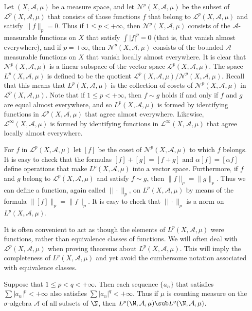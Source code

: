 Let $(X,\mathcal{A},\mu)$ be a measure space, and let $\mathcal{N}^p(X,\mathcal{A},\mu)$ be the subset of $\mathcal{L}^p(X,\mathcal{A},\mu)$ that consists of those functions $f$ that belong to $\mathcal{L}^p(X,\mathcal{A},\mu)$ and satisfy $\|f\|_p=0$. Thus if $1\leq p<+\infty$, then $\mathcal{N}^p(X,\mathcal{A},\mu)$ consists of the $\mathcal{A}$-measurable functions on $X$ that satisfy $\int|f|^p=0$ (that is, that vanish almost everywhere), and if $p=+\infty$, then $\mathcal{N}^p(X,\mathcal{A},\mu)$ consists of the bounded $\mathcal{A}$-measurable functions on $X$ that vanish locally almost everywhere. It is clear that $\mathcal{N}^p(X,\mathcal{A},\mu)$ is a linear subspace of the vector space $\mathcal{L}^p(X,\mathcal{A},\mu)$. The space $L^p(X,\mathcal{A},\mu)$ is defined to be the quotient $\mathcal{L}^p(X,\mathcal{A},\mu)/\mathcal{N}^p(X,\mathcal{A},\mu)$. Recall that this means that $L^p(X,\mathcal{A},\mu)$ is the collection of cosets of $\mathcal{N}^p(X,\mathcal{A},\mu)$ in $\mathcal{L}^p(X,\mathcal{A},\mu)$. Note that if $1\leq p<+\infty$, then $f\sim g$ holds if and only if $f$ and $g$ are equal almost everywhere, and so $L^p(X,\mathcal{A},\mu)$ is formed by identifying functions in $\mathcal{L}^p(X,\mathcal{A},\mu)$ that agree almost everywhere. Likewise, $\mathcal{L}^\infty(X,\mathcal{A},\mu)$ is formed by identifying functions in $\mathcal{L}^\infty(X,\mathcal{A},\mu)$ that agree locally almost everywhere.\par
For $f$ in $\mathcal{L}^p(X,\mathcal{A},\mu)$ let $[f]$ be the coset of $\mathcal{N}^p(X,\mathcal{A},\mu)$ to which $f$ belongs. It is easy to check that the formulas $[f]+[g]=[f+g]$ and $\alpha[f]=[\alpha f]$ define operations that make $L^p(X,\mathcal{A},\mu)$ into a vector space. Furthermore, if $f$ and $g$ belong to $\mathcal{L}^p(X,\mathcal{A},\mu)$ and satisfy $f\sim g$, then $\|f\|_p=\|g\|_p$. Thus we can define a function, again called $\|\cdot\|_p$, on $L^p(X,\mathcal{A},\mu)$ by means of the formula $\|[f]\|_p=\|f\|_p$. It is easy to check that $\|\cdot\|_p$ is a norm on $L^p(X,\mathcal{A},\mu)$.\par
It is often convenient to act as though the elements of $L^p(X,\mathcal{A},\mu)$ were functions, rather than equivalence classes of functions. We will often deal with $\mathcal{L}^p(X,\mathcal{A},\mu)$ when proving theorems about $L^p(X,\mathcal{A},\mu)$. This will imply the completeness of $L^p(X,\mathcal{A},\mu)$ and yet avoid the cumbersome notation associated with equivalence classes.
\begin{example}
Suppose that $1\leq p<q<+\infty$. Then each sequence $\{a_n\}$ that satisfies $\sum|a_n|^{p}<+\infty$ also satisfies $\sum|a_n|^{q}<+\infty$. Thus if $\mu$ is counting measure on the $\sigma$-algebra $\mathcal{A}$ of all subsets of $\N$, then $L^{p}(\N,\mathcal{A},\mu)\sub L^{q}(\N,\mathcal{A},\mu)$.
\end{example}
